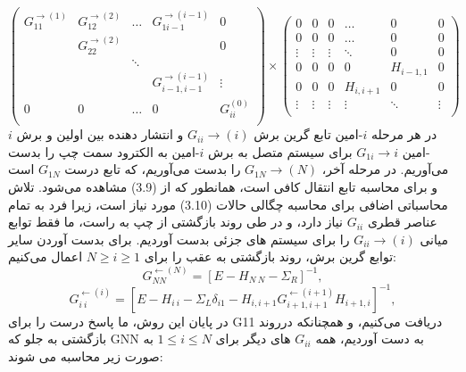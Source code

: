 \begin{equation}
    \left( \begin{matrix}
        G_{11}^{\to (1)} & G_{12}^{\to (2)} & \ldots  & G_{1i-1}^{\to (i-1)} & 0  \\
        {} & G_{22}^{\to (2)} & {} & {} & 0  \\
        {} & {} & \ddots  & {} & {}  \\
        {} & {} & {} & G_{i-1,i-1}^{\to (i-1)} & \vdots   \\
        0 & 0 & \ldots  & 0 & G_{ii}^{(0)}  \\
        \end{matrix} \right)\times \left( \begin{matrix}
        0 & 0 & 0 & \ldots  & 0 & 0  \\
        0 & 0 & 0 & \ldots  & 0 & 0  \\
        \vdots  & \vdots  & \vdots  & \ddots  & 0 & 0  \\
        0 & 0 & 0 & 0 & {{H}_{i-1,1}} & 0  \\
        0 & 0 & 0 & {{H}_{i,i+1}} & 0 & 0  \\
        \vdots  & \vdots  & \vdots  & \vdots  & \ddots  & \vdots   \\
    \end{matrix} \right)
\end{equation}
در هر مرحله $i$-امین تابع گرین برش $G_{ii}\rightarrow(i)$ و انتشار دهنده بین اولین و برش $i$-امین $G_{1i}\rightarrow{i}$ برای سیستم متصل به برش $i$-امین به الکترود سمت چپ را بدست می‌آوریم. در مرحله آخر، $G_{1N}\rightarrow(N)$ را بدست می‌آوریم، که تابع درست $G_{1N}$ است و برای محاسبه تابع انتقال کافی است، همانطور که از (3.9) مشاهده می‌شود.
تلاش محاسباتی اضافی برای محاسبه چگالی حالات (3.10) مورد نیاز است، زیرا فرد به تمام عناصر قطری $G_{ii}$ نیاز دارد، و در طی روند بازگشتی از چپ به راست، ما فقط توابع میانی $G_{ii}\rightarrow(i)$ را برای سیستم های جزئی بدست آوردیم. برای بدست آوردن سایر توابع گرین برش، روند بازگشتی به عقب را برای $N ≥ i ≥ 1$ اعمال می‌کنیم:
\begin{equation}
    G_{NN}^{\leftarrow (N)}={{\left[ E-{{H}_{N\ N}}-{{\Sigma }_{R}} \right]}^{-1}},
\end{equation}
\begin{equation}
    G_{i\ i}^{\leftarrow (i)}={{\left[ E-{{H}_{i\ i}}-{{\Sigma }_{L}}{{\delta }_{i1}}-{{H}_{i,i+1}}G_{i+1,i+1}^{\leftarrow (i+1)}{{H}_{i+1,i}} \right]}^{-1}},
\end{equation}
در پایان این روش، ما پاسخ درست را برای G11 دریافت می‌کنیم، و همچنانکه درروند بازگشتی به جلو که GNN به دست آوردیم، همه $G_{ii}$ های دیگر برای  $1≤ i ≤ N$ به صورت زیر محاسبه می شوند:
